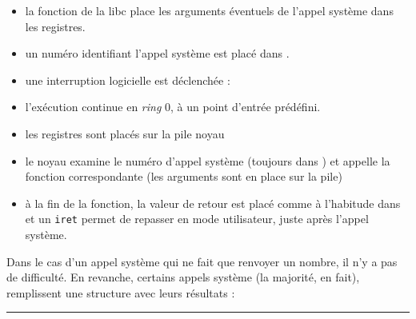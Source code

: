 \begin{itemize}
\item
  la fonction de la libc place les arguments éventuels de l'appel
  système dans les registres.
\item
  un numéro identifiant l'appel système est placé dans \eax.
\item
  une interruption logicielle est déclenchée :
\item
  l'exécution continue en \emph{ring} 0, à un point d'entrée prédéfini.
\item 
  les registres sont placés sur la pile noyau
\item
  le noyau examine le numéro d'appel système (toujours dans \eax) et appelle la
  fonction correspondante (les arguments sont en place sur la pile)
\item
  à la fin de la fonction, la valeur de retour est placé comme à l'habitude dans
  \eax et un \texttt{iret} permet de repasser en mode utilisateur, juste après
  l'appel système.
\end{itemize}


\cite{intelsys}

Dans le cas d'un appel système qui ne fait que renvoyer un nombre, il n'y a pas
de difficulté. En revanche, certains appels système (la majorité, en fait),
remplissent une structure avec leurs résultats :

\begin{center}\rule{3in}{0.4pt}\end{center}

